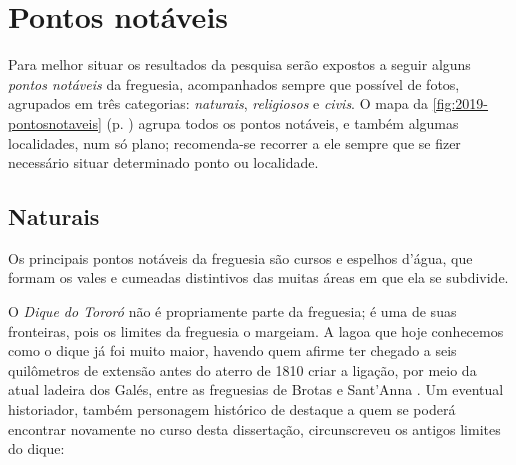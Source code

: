 \section{Pontos notáveis}\label{sec:pontnot}

Para melhor situar os resultados da pesquisa serão expostos a seguir alguns \textit{pontos notáveis} da freguesia, acompanhados sempre que possível de fotos, agrupados em três categorias: \textit{naturais}, \textit{religiosos} e \textit{civis}. O mapa da \autoref{fig:2019-pontosnotaveis} (p. \pageref{fig:2019-pontosnotaveis}) agrupa todos os pontos notáveis, e também algumas localidades, num só plano; recomenda-se recorrer a ele sempre que se fizer necessário situar determinado ponto ou localidade.

\subsection{Naturais}\label{subsec:pontnat}

Os principais pontos notáveis da freguesia são cursos e espelhos d'água, que formam os vales e cumeadas distintivos das muitas áreas em que ela se subdivide.

O \textit{Dique do Tororó} não é propriamente parte da freguesia; é uma de suas fronteiras, pois os limites da freguesia o margeiam. A lagoa que hoje conhecemos como o dique já foi muito maior, havendo quem afirme ter chegado a seis quilômetros de extensão antes do aterro de 1810 criar a ligação, por meio da atual ladeira dos Galés, entre as freguesias de Brotas e Sant'Anna \cite[p.~48]{santos_aguas_2010}. Um eventual historiador, também personagem histórico de destaque a quem se poderá encontrar novamente no curso desta dissertação, circunscreveu os antigos limites do dique:


